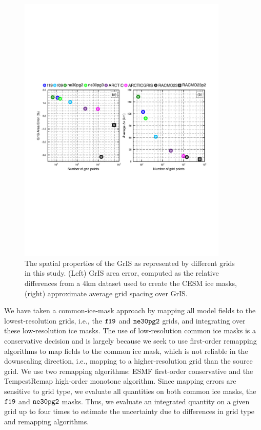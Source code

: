 \documentclass[draft]{agujournal2019}
\begin{document}
\begin{figure}[t]
\begin{center}
         \includegraphics[width=100mm]{figs/temp_grisres.pdf}
\end{center}
\caption{The spatial properties of the GrIS as represented by different grids in this study. (Left) GrIS area error, computed as the relative differences from a 4km dataset used to create the CESM ice masks, (right) approximate average grid spacing over GrIS.}
\label{fig:grisdx}
\end{figure}

We have taken a common-ice-mask approach by mapping all model fields to the lowest-resolution grids, i.e., the $\tt f19$ and $\tt ne30pg2$ grids, and integrating over these low-resolution ice masks. The use of low-resolution common ice masks is a conservative decision and is largely because we seek to use first-order remapping algorithms to map fields to the common ice mask, which is not reliable in the downscaling direction, i.e., mapping to a higher-resolution grid than the source grid. We use two remapping algorithms: ESMF first-order conservative and the TempestRemap \cite{TempestRemap} high-order monotone algorithm. Since mapping errors are sensitive to grid type, we evaluate all quantities on both common ice masks, the $\tt f19$ and $\tt ne30pg2$ masks. Thus, we evaluate an integrated quantity on a given grid up to four times to estimate the uncertainty due to differences in grid type and remapping algorithms.
\end{document}
